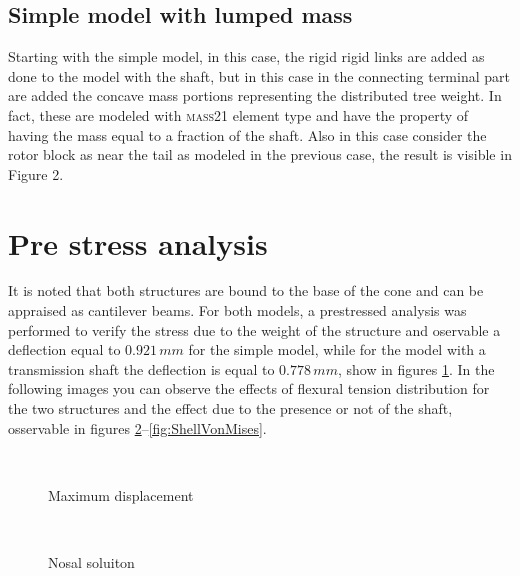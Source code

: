 \subsection{Simple model with lumped mass}
Starting with the simple model, in this case, the rigid rigid links are added as done to the model with the shaft, but in this case in the connecting terminal part are added the concave mass portions representing the distributed tree weight. In fact, these are modeled with \textsc{mass21} element type and have the property of having the mass equal to a fraction of the shaft.
Also in this case consider the rotor block as near the tail as modeled in the previous case, the result is visible in Figure 2.

\section{Pre stress analysis}
It is noted that both structures are bound to the base of the cone and can be appraised as cantilever beams.
For both models, a prestressed analysis was performed to verify the stress due to the weight of the structure and oservable a deflection equal to $0.921\, mm$ for the simple model, while for the model with a transmission shaft the deflection is equal to $0.778\, mm$, show in figures \ref{fig:ShellDisplacement}.
In the following images you can observe the effects of flexural tension distribution for the two structures and the effect due to the presence or not of the shaft, osservable in figures \ref{fig:ShellNodalSolu}--\ref{fig:ShellVonMises}.

\begin{figure}[ht]
\centering
{} \quad
{} \\
   \caption{Maximum displacement}
   \label{fig:ShellDisplacement}
\end{figure}

\begin{figure}[ht]
\centering
{} \quad
{}\\
\caption{Nosal soluiton}
\label{fig:ShellNodalSolu}
\end{figure}

